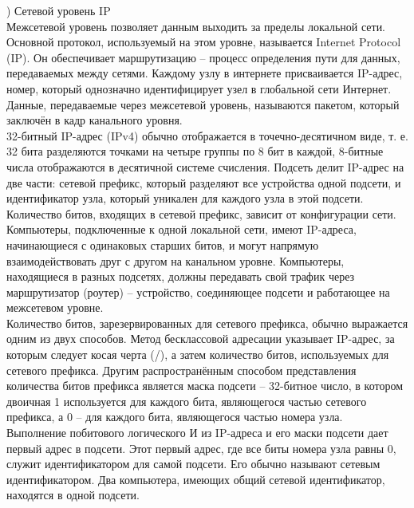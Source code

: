 ) Сетевой уровень IP \\
Межсетевой уровень позволяет данным выходить за пределы локальной сети. Основной протокол, используемый на этом уровне, называется Internet Protocol (IP). Он обеспечивает маршрутизацию – процесс определения пути для данных, передаваемых между сетями. Каждому узлу в интернете присваивается IP-адрес, номер, который однозначно идентифицирует узел в глобальной сети Интернет. Данные, передаваемые через межсетевой уровень, называются пакетом, который заключён в кадр канального уровня. \\
32-битный IP-адрес (IPv4) обычно отображается в точечно-десятичном виде, т. е. 32 бита разделяются точками на четыре группы по 8 бит в каждой, 8-битные числа отображаются в десятичной системе счисления. Подсеть делит IP-адрес на две части: сетевой префикс, который разделяют все устройства одной подсети, и идентификатор узла, который уникален для каждого узла в этой подсети. Количество битов, входящих в сетевой префикс, зависит от конфигурации сети. \\
Компьютеры, подключенные к одной локальной сети, имеют IP-адреса, начинающиеся с одинаковых старших битов, и могут напрямую взаимодействовать друг с другом на канальном уровне. Компьютеры, находящиеся в разных подсетях, должны передавать свой трафик через маршрутизатор (роутер) – устройство, соединяющее подсети и работающее на межсетевом уровне. \\
Количество битов, зарезервированных для сетевого префикса, обычно выражается одним из двух способов. Метод бесклассовой адресации указывает IP-адрес, за которым следует косая черта (/), а затем количество битов, используемых для сетевого префикса. Другим распространённым способом представления количества битов префикса является маска подсети – 32-битное число, в котором двоичная 1 используется для каждого бита, являющегося частью сетевого префикса, а 0 – для каждого бита, являющегося частью номера узла. \\
Выполнение побитового логического И из IP-адреса и его маски подсети дает первый адрес в подсети. Этот первый адрес, где все биты номера узла равны 0, служит идентификатором для самой подсети. Его обычно называют сетевым идентификатором. Два компьютера, имеющих общий сетевой идентификатор, находятся в одной подсети. \\

